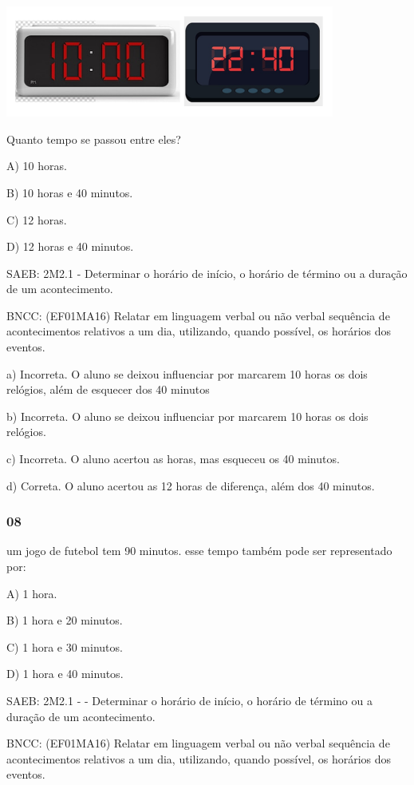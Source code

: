\includegraphics[width=4.26398in,height=1.43904in]{media/image156.png}

Quanto tempo se passou entre eles?

A) 10 horas.

B) 10 horas e 40 minutos.

C) 12 horas.

D) 12 horas e 40 minutos.

SAEB: 2M2.1 - Determinar o horário de início, o horário de término ou a
duração de um acontecimento.

BNCC: (EF01MA16) Relatar em linguagem verbal ou não verbal sequência de
acontecimentos relativos a um dia, utilizando, quando possível, os
horários dos eventos.

a) Incorreta. O aluno se deixou influenciar por marcarem 10 horas os
dois relógios, além de esquecer dos 40 minutos

b) Incorreta. O aluno se deixou influenciar por marcarem 10 horas os
dois relógios.

c) Incorreta. O aluno acertou as horas, mas esqueceu os 40 minutos.

d) Correta. O aluno acertou as 12 horas de diferença, além dos 40
minutos.

\subsubsection{08}\label{section-139}

um jogo de futebol tem 90 minutos. esse tempo também pode ser
representado por:

A) 1 hora.

B) 1 hora e 20 minutos.

C) 1 hora e 30 minutos.

D) 1 hora e 40 minutos.

SAEB: 2M2.1 - - Determinar o horário de início, o horário de término ou
a duração de um acontecimento.

BNCC: (EF01MA16) Relatar em linguagem verbal ou não verbal sequência de
acontecimentos relativos a um dia, utilizando, quando possível, os
horários dos eventos.

